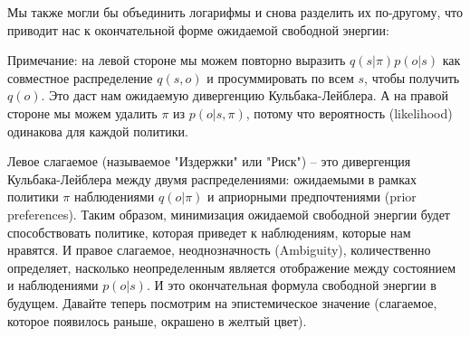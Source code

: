 \documentclass[twoside,leqno, 11pt]{article}
\begin{document}
	
	Мы также могли бы объединить логарифмы и снова разделить их по-другому, что приводит нас к окончательной форме ожидаемой свободной энергии:
	
	
	\begin{figure}[h]
	\end{figure}
	
	Примечание: на левой стороне мы можем повторно выразить $q(s|\pi) p(o|s)$ как совместное распределение $q(s,o)$ и просуммировать по всем $s$, чтобы получить $q(o)$. Это даст нам ожидаемую дивергенцию Кульбака-Лейблера. А на правой стороне мы можем удалить $\pi$ из $p(o|s,\pi)$, потому что вероятность (likelihood) одинакова для каждой политики.
	
	
	Левое слагаемое (называемое "Издержки" или "Риск") -- это дивергенция Кульбака-Лейблера между двумя распределениями: ожидаемыми в рамках политики $\pi$ наблюдениями $q(o|\pi)$ и априорными предпочтениями (prior preferences). Таким образом, минимизация ожидаемой свободной энергии будет способствовать политике, которая приведет к наблюдениям, которые нам нравятся. И правое слагаемое, неоднозначность (Ambiguity), количественно определяет, насколько неопределенным является отображение между состоянием и наблюдениями $p(o|s)$. И это окончательная формула свободной энергии в будущем. Давайте теперь посмотрим на эпистемическое значение (слагаемое, которое появилось раньше, окрашено в желтый цвет).
	
\end{document}
